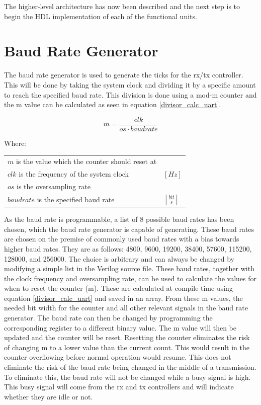\documentclass[./dissertation.tex]{subfiles}
\begin{document}
The higher-level architecture has now been described and the next step is to begin the HDL implementation of each of the functional units.

\section{Baud Rate Generator}
The baud rate generator is used to generate the ticks for the rx/tx controller. This will be done by taking the system clock and dividing it by a specific amount to reach the specified baud rate. This division is done using a mod-m counter and the m value can be calculated as seen in equation \ref{divisor_calc_uart}.

\begin{equation}
    \label{divisor_calc_uart}
    m = \frac{clk}{os \cdot baudrate}
\end{equation}

Where:
\begin{table}[H]
\begin{tabular}{ll}
$m$ is the value which the counter should reset at & \\
$clk$ is the frequency of the system clock & $[Hz]$\\
$os$ is the oversampling rate & \\
$baudrate$ is the specified baud rate & $[\frac{bit}{s}]$
\end{tabular}
\end{table}

As the baud rate is programmable, a list of 8 possible baud rates has been chosen, which the baud rate generator is capable of generating. These baud rates are chosen on the premise of commonly used baud rates with a bias towards higher baud rates. They are as follows: 4800, 9600, 19200, 38400, 57600, 115200, 128000, and 256000. The choice is arbitrary and can always be changed by modifying a simple list in the Verilog source file. These baud rates, together with the clock frequency and oversampling rate, can be used to calculate the values for when to reset the counter (m). These are calculated at compile time using equation \ref{divisor_calc_uart} and saved in an array. From these m values, the needed bit width for the counter and all other relevant signals in the baud rate generator. The baud rate can then be changed by programming the corresponding register to a different binary value. The m value will then be updated and the counter will be reset. Resetting the counter eliminates the risk of changing m to a lower value than the current count. This would result in the counter overflowing before normal operation would resume. This does not eliminate the risk of the baud rate being changed in the middle of a transmission. To eliminate this, the baud rate will not be changed while a busy signal is high. This busy signal will come from the rx and tx controllers and will indicate whether they are idle or not.
\end{document}
